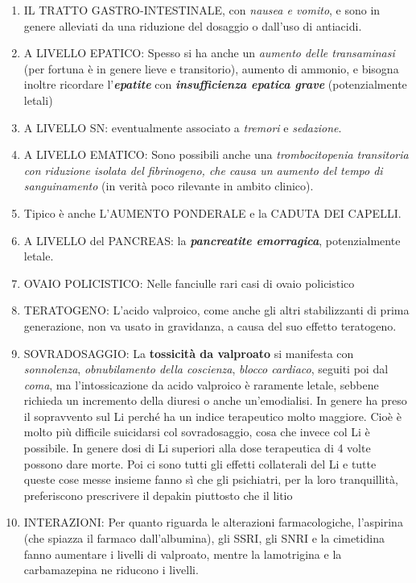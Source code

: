 \documentclass[]{article}
\begin{document}
\begin{enumerate}
\def\labelenumi{\arabic{enumi}.}
\item
  IL TRATTO GASTRO-INTESTINALE, con \emph{nausea e vomito}, e sono in
  genere alleviati da una riduzione del dosaggio o dall'uso di
  antiacidi.
\item
  A LIVELLO EPATICO: Spesso si ha anche un \emph{aumento delle
  transaminasi} (per fortuna è in genere lieve e transitorio), aumento
  di ammonio, e bisogna inoltre ricordare l'\textbf{\emph{epatite}} con
  \textbf{\emph{insufficienza epatica grave}} (potenzialmente letali)
\item
  A LIVELLO SN: eventualmente associato a \emph{tremori} e
  \emph{sedazione}.
\item
  A LIVELLO EMATICO: Sono possibili anche una \emph{trombocitopenia
  transitoria con riduzione isolata del fibrinogeno, che causa un
  aumento del tempo di sanguinamento} (in verità poco rilevante in
  ambito clinico).
\item
  Tipico è anche L'AUMENTO PONDERALE e la CADUTA DEI CAPELLI.
\item
  A LIVELLO del PANCREAS: la \textbf{\emph{pancreatite emorragica}},
  potenzialmente letale.
\item
  OVAIO POLICISTICO: Nelle fanciulle rari casi di ovaio policistico
\item
  TERATOGENO: L'acido valproico, come anche gli altri stabilizzanti di
  prima generazione, non va usato in gravidanza, a causa del suo effetto
  teratogeno.
\item
  SOVRADOSAGGIO: La \textbf{tossicità da valproato} si manifesta con
  \emph{sonnolenza}, \emph{obnubilamento della coscienza}, \emph{blocco
  cardiaco}, seguiti poi dal \emph{coma}, ma l'intossicazione da acido
  valproico è raramente letale, sebbene richieda un incremento della
  diuresi o anche un'emodialisi. In genere ha preso il sopravvento sul
  Li perché ha un indice terapeutico molto maggiore. Cioè è molto più
  difficile suicidarsi col sovradosaggio, cosa che invece col Li è
  possibile. In genere dosi di Li superiori alla dose terapeutica di 4
  volte possono dare morte. Poi ci sono tutti gli effetti collaterali
  del Li e tutte queste cose messe insieme fanno sì che gli psichiatri,
  per la loro tranquillità, preferiscono prescrivere il depakin
  piuttosto che il litio
\item
  INTERAZIONI: Per quanto riguarda le alterazioni farmacologiche,
  l'aspirina (che spiazza il farmaco dall'albumina), gli SSRI, gli SNRI
  e la cimetidina fanno aumentare i livelli di valproato, mentre la
  lamotrigina e la carbamazepina ne riducono i livelli.
\end{enumerate}
\end{document}
